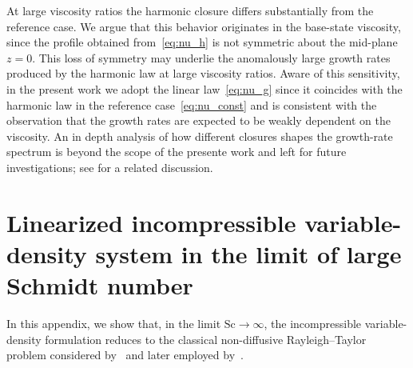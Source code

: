 \documentclass[11pt]{article}
\newcommand{\Sch}{\mathrm{Sc}}
\newenvironment{appen}{\appendix}{}
\begin{document}
\begin{appen}
At large viscosity ratios the harmonic closure differs substantially from the reference case. We argue that this behavior originates in the base-state viscosity, since the profile obtained from~\eqref{eq:nu_h} is not symmetric about the mid-plane \(z = 0\). This loss of symmetry may underlie the anomalously large growth rates produced by the harmonic law at large viscosity ratios. Aware of this sensitivity, in the present work we adopt the linear law~\eqref{eq:nu_g} since it coincides with the harmonic law in the reference case~\eqref{eq:nu_const} and is consistent with the observation that the growth rates are expected to be weakly dependent on the viscosity.
An in depth analysis of how different closures shapes the growth-rate spectrum is beyond the scope of the presente work and left for future investigations; see \citet{govindarajan-sahu-2014} for a related discussion.



\section{Linearized incompressible variable-density system in the limit of large Schmidt number}
\label{sec:appendix_Sc_infinity_chandra_limit}
In this appendix, we show that, in the limit \(\Sch \to \infty\), the incompressible variable-density formulation reduces to the classical non-diffusive Rayleigh--Taylor problem considered by~\citet{chandrasekhar-1961} and later employed by~\citet{morgan-likhachev-jacobs-2016}.


\end{appen}
\end{document}
